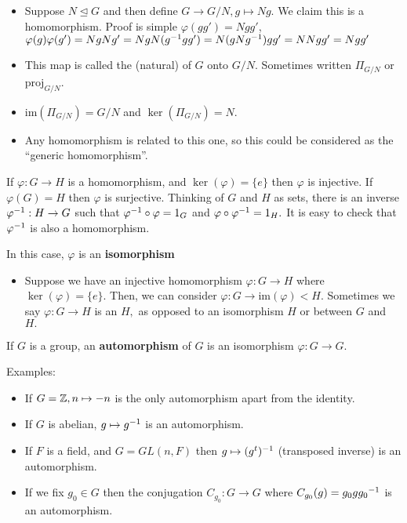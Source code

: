 \documentclass[a4paper]{article}
\begin{document}
\begin{itemize}
    \item Suppose $N\trianglelefteq G$ and then define $G\to G/N, g\mapsto Ng$. We claim this is a homomorphism. Proof is simple $\varphi(gg')=Ngg'$, $\varphi(g)\varphi(g')=NgNg'=NgN(g^{-1} gg')=N(gNg^{-1})gg'=NNgg'=Ngg'$ 
    \item This map is called the (natural)  of $G$ onto $G/N$. Sometimes written $\Pi_{G/N}$ or $\mathrm{proj}_{G/N}$.
    \item $\mathrm{im}(\Pi_{G/N})=G/N$ and $\ker(\Pi_{G/N})=N$.
    \item Any homomorphism is related to this one, so this could be considered as the ``generic homomorphism''.
\end{itemize}
\begin{definition}[Isomorphism]
    If $\varphi:G\to H$ is a homomorphism, and $\ker(\varphi)=\{e\}$ then $\varphi$ is injective.
    If $\varphi(G)=H$ then $\varphi$ is surjective. Thinking of $G$ and $H$ as sets, there is an inverse $\varphi^{-1}:H\to G$ such that $\varphi^{-1}\circ\varphi=1_G$ and $\varphi\circ\varphi^{-1}=1_H.$ It is easy to check that $\varphi^{-1}$ is also a homomorphism.

    In this case, $\varphi$ is an \textbf{isomorphism}
\end{definition}
\begin{itemize}
    \item Suppose we have an injective homomorphism $\varphi:G\to H$ where $\ker(\varphi)=\{e\}.$ Then, we can consider $\varphi:G\to\mathrm{im}(\varphi)<H.$ Sometimes we say $\varphi:G\to H$ is an  $H,$ as opposed to an isomorphism  $H$ or between $G$ and $H.$
\end{itemize}
\begin{definition}[Automorphism]
    If $G$ is a group, an \textbf{automorphism} of $G$ is an isomorphism $\varphi:G\to G.$
\end{definition}
Examples:
\begin{itemize}
    \item If $G=\mathbb{Z},n\mapsto-n$ is the only automorphism apart from the identity.
    \item If $G$ is abelian, $g\mapsto g^{-1}$ is an automorphism.
    \item If $F$ is a field, and $G=GL(n,F)$ then $g\mapsto(g^t)^{-1}$ (transposed inverse) is an automorphism.
    \item If we fix $g_0\in G$ then the conjugation $C_{g_0}:G\to G$ where $C_{g_0}(g)=g_0g{g_0}^{-1}$ is an automorphism. 
\end{itemize}
\end{document}
